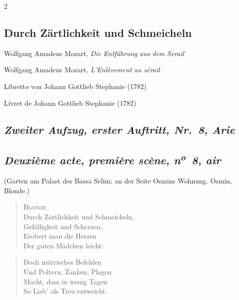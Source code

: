\documentclass[a4paper,12pt]{article}
\newcommand\chunks[2]{%
\begin{leftcolumn*}\begin{otherlanguage}{german}%
{#1}%
\end{otherlanguage}\end{leftcolumn*}%
\begin{rightcolumn}\begin{otherlanguage}{french}%
{#2}%
\end{otherlanguage}\end{rightcolumn}%
}
\newcommand\strophe[1]{\subsection*{\normalsize\normalfont\itshape #1}}
\begin{document}
\thispagestyle{empty}
\setlength{\columnsep}{8mm}


\begin{paracol}{2}

  \chunks{\section*{Durch Zärtlichkeit und Schmeicheln}}
         {}

  \chunks{\noindent\raggedright\small Wolfgang Amadeus Mozart, \textit{Die Entführung aus dem Serail}}
         {\noindent\raggedright\small Wolfgang Amadeus Mozart, \textit{L’Enlèvement au sérail}}

  \chunks{\noindent\raggedright\small Libretto von Johann Gottlieb Stephanie (1782)}
         {\noindent\raggedright\small Livret de Johann Gottlieb Stephanie (1782)}

  \chunks{\strophe{Zweiter Aufzug, erster Auftritt, Nr.~8, Arie}}
         {\strophe{Deuxième acte, première scène, n\textsuperscript{o}~8, air}}

  \chunks{\noindent\small(Garten am Palast des Bassa Selim; an der Seite Osmins Wohnung. Osmin, Blonde.)}
         {}

  \chunks{\begin{verse}
          \textsc{Blonde}\\[\medskipamount]
          Durch Zärtlichkeit und Schmeicheln,\\
          Gefälligkeit und Scherzen,\\
          Erobert man die Herzen\\
          Der guten Mädchen leicht:
          \end{verse}}
         {}

  \chunks{\begin{verse}
          Doch mürrisches Befehlen\\
          Und Poltern, Zanken, Plagen\\
          Macht, dass in wenig Tagen\\
          So Lieb’ als Treu entweicht.
          \end{verse}}
         {}
\end{paracol}
\end{document}
